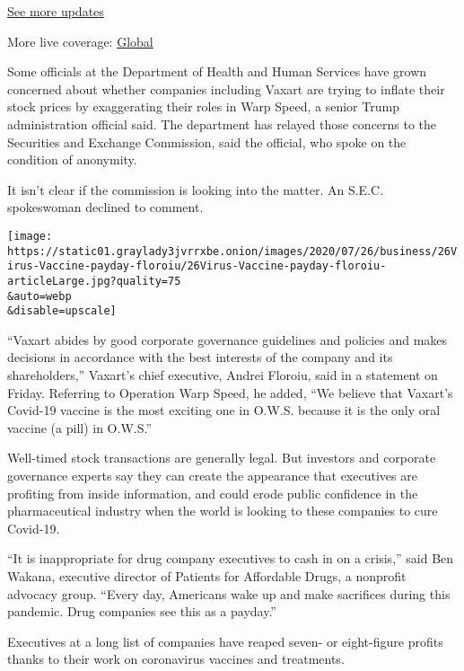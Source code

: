 \href{https://www.nytimes3xbfgragh.onion/live/2020/08/03/business/stock-market-today-coronavirus?action=click\&pgtype=Article\&state=default\&region=MAIN_CONTENT_1\&context=storylines_live_updates}{See
more updates}

More live coverage:
\href{https://www.nytimes3xbfgragh.onion/2020/08/03/world/coronavirus-covid-19.html?action=click\&pgtype=Article\&state=default\&region=MAIN_CONTENT_1\&context=storylines_live_updates}{Global}

Some officials at the Department of Health and Human Services have grown
concerned about whether companies including Vaxart are trying to inflate
their stock prices by exaggerating their roles in Warp Speed, a senior
Trump administration official said. The department has relayed those
concerns to the Securities and Exchange Commission, said the official,
who spoke on the condition of anonymity.

It isn't clear if the commission is looking into the matter. An S.E.C.
spokeswoman declined to comment.

\texttt{[image: https://static01.graylady3jvrrxbe.onion/images/2020/07/26/business/26Virus-Vaccine-payday-floroiu/26Virus-Vaccine-payday-floroiu-articleLarge.jpg?quality=75\\\&auto=webp\\\&disable=upscale]}

``Vaxart abides by good corporate governance guidelines and policies and
makes decisions in accordance with the best interests of the company and
its shareholders,'' Vaxart's chief executive, Andrei Floroiu, said in a
statement on Friday. Referring to Operation Warp Speed, he added, ``We
believe that Vaxart's Covid-19 vaccine is the most exciting one in
O.W.S. because it is the only oral vaccine (a pill) in O.W.S.''

Well-timed stock transactions are generally legal. But investors and
corporate governance experts say they can create the appearance that
executives are profiting from inside information, and could erode public
confidence in the pharmaceutical industry when the world is looking to
these companies to cure Covid-19.

``It is inappropriate for drug company executives to cash in on a
crisis,'' said Ben Wakana, executive director of Patients for Affordable
Drugs, a nonprofit advocacy group. ``Every day, Americans wake up and
make sacrifices during this pandemic. Drug companies see this as a
payday.''

Executives at a long list of companies have reaped seven- or
eight-figure profits thanks to their work on coronavirus vaccines and
treatments.

